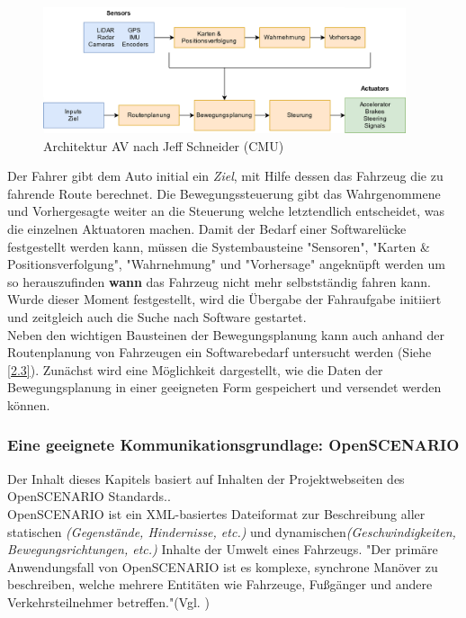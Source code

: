 \begin{figure}[H]
	\centering
	\includegraphics[width=0.95\textwidth]{../pictures/arichtecture_AV.png}
	\caption{Architektur AV nach Jeff Schneider (CMU) \cite{jschneider}}
\end{figure}
Der Fahrer gibt dem Auto initial ein \textit{Ziel}, mit Hilfe dessen das Fahrzeug die zu fahrende Route berechnet. Die Bewegungssteuerung gibt das Wahrgenommene und Vorhergesagte weiter an die Steuerung welche letztendlich entscheidet, was die einzelnen Aktuatoren machen.
Damit der Bedarf einer Softwarelücke festgestellt werden kann, müssen die Systembausteine "Sensoren", "Karten \& Positionsverfolgung", "Wahrnehmung" und "Vorhersage" angeknüpft werden um so herauszufinden \textbf{wann} das Fahrzeug nicht mehr selbstständig fahren kann. Wurde dieser Moment festgestellt, wird die Übergabe der Fahraufgabe initiiert und zeitgleich auch die Suche nach Software gestartet.\\
Neben den wichtigen Bausteinen der Bewegungsplanung kann auch anhand der Routenplanung von Fahrzeugen ein Softwarebedarf untersucht werden (Siehe \ref{2.3}). Zunächst wird eine Möglichkeit dargestellt, wie die Daten der Bewegungsplanung in einer geeigneten Form gespeichert und versendet werden können.
\subsubsection{Eine geeignete Kommunikationsgrundlage: OpenSCENARIO}\label{2.2}
Der Inhalt dieses Kapitels basiert auf Inhalten der Projektwebseiten des OpenSCENARIO Standards.\cite{b35}.\\
OpenSCENARIO ist ein XML-basiertes Dateiformat zur Beschreibung aller statischen \textit{(Gegenstände, Hindernisse, etc.)} und dynamischen\textit{(Geschwindigkeiten, Bewegungsrichtungen, etc.)} Inhalte der Umwelt eines Fahrzeugs. "Der primäre Anwendungsfall von OpenSCENARIO ist es komplexe, synchrone Manöver zu beschreiben, welche mehrere Entitäten wie Fahrzeuge, Fußgänger und andere Verkehrsteilnehmer betreffen."(Vgl. \cite[asam.net]{b35})\\

